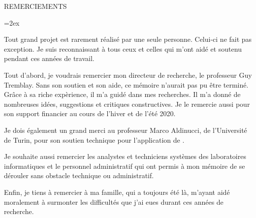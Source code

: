 
   \parskip=0pt
   \vspace*{0.1 truecm} 
   \begin{center}
    {\uppercase { REMERCIEMENTS }}\par
   \end{center}
   \nobreak \vspace*{1.10 truecm}
   \parskip=2ex

Tout grand projet est rarement r\'ealis\'e par une seule personne. Celui-ci ne fait pas exception. Je suis reconnaissant \`a tous ceux et celles qui m'ont aid\'e et soutenu pendant ces ann\'ees de travail.

Tout d'abord, je voudrais remercier mon directeur de recherche, le professeur Guy Tremblay. Sans son soutien et son aide, ce m\'emoire n'aurait pas pu \^etre termin\'e. Gr\^ace \`a sa riche exp\`erience, il m'a guid\'e dans mes recherches. Il m'a donn\'e de nombreuses id\'ees, suggestions et critiques constructives.
%
Je le remercie aussi pour son support financier au cours de l'hiver et de l'été 2020.

Je dois \'egalement un grand merci au professeur Marco Aldinucci, de l'Universit\'e de Turin, pour son soutien technique pour l'application de . 

Je souhaite aussi remercier les analystes et techniciens syst\`emes des laboratoires informatiques et le personnel administratif qui ont permis \`a mon m\'emoire de se d\'erouler sans obstacle technique ou administratif.

Enfin, je tiens \`a remercier \`a ma famille, qui a toujours \'et\'e l\`a, m'ayant aid\'e moralement \`a surmonter les difficult\'es que j'ai eues durant ces ann\'ees de recherche. 


